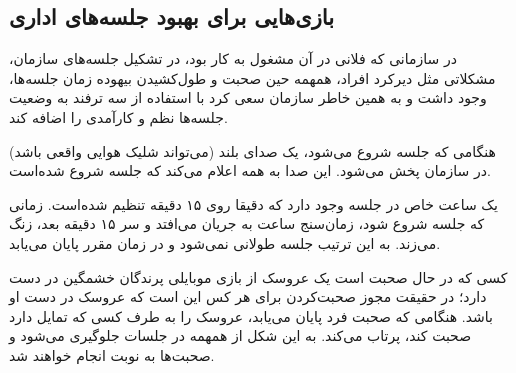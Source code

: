 \subsection{بازی‌هایی برای بهبود جلسه‌های اداری}
در سازمانی که فلانی %
در آن مشغول به کار بود، در تشکیل جلسه‌های سازمان، مشکلاتی مثل دیرکرد افراد، همهمه حین صحبت و طول‌کشیدن بیهوده زمان جلسه‌ها، وجود داشت و به همین خاطر سازمان سعی کرد با استفاده از سه ترفند به وضعیت جلسه‌ها نظم و کارآمدی را اضافه کند.
\begin{trick}
هنگامی که جلسه شروع می‌شود، یک صدای بلند (می‌تواند شلیک هوایی واقعی باشد) در سازمان پخش می‌شود. این صدا به همه اعلام می‌کند که جلسه شروع شده‌است.
\end{trick}
\begin{trick}
یک ساعت خاص در جلسه وجود دارد که دقیقا روی ۱۵ دقیقه تنظیم شده‌است. زمانی که جلسه شروع شود، زمان‌سنج ساعت به جریان می‌افتد و سر ۱۵ دقیقه بعد، زنگ می‌زند. به این ترتیب جلسه طولانی نمی‌شود و در زمان مقرر پایان می‌یابد.
\end{trick}
\begin{trick}
کسی که در حال صحبت است یک عروسک از بازی موبایلی پرندگان خشمگین در دست دارد؛ در حقیقت مجوز صحبت‌کردن برای هر کس این است که عروسک در دست او باشد. هنگامی که صحبت فرد پایان می‌یابد، عروسک را به طرف کسی که تمایل دارد صحبت کند، پرتاب می‌کند. به این شکل از همهمه در جلسات جلوگیری می‌شود و صحبت‌ها به نوبت انجام خواهند شد.
\end{trick}
